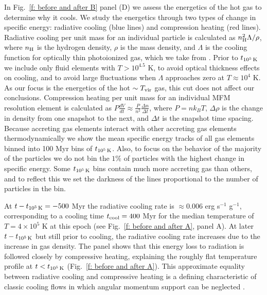 \documentclass[fleqn,usenatbib]{mnras}
\newcommand{\tcools}{t_{10^5\,{\rm K}}}
\newcommand{\nH}{n_{\rm H}}
\newcommand{\Tvir}{T_{\rm vir}}
\begin{document}
In Fig.~\ref{f: before and after B} panel (D) we assess the energetics of the hot gas to determine why it cools.
We study the energetics through two types of change in specific energy: radiative cooling (blue lines) and compression heating (red lines).
Radiative cooling per unit mass for an individual particle is calculated as $\nH^2 \Lambda / \rho$, where $\nH$ is the hydrogen density, $\rho$ is the mass density, and $\Lambda$ is the cooling function for optically thin photoionized gas, which we take from \cite{Wiersma2009a}.
Prior to $\tcools$ we include only fluid elements with $T>10^{4.5}$ K, to avoid optical thickness effects on cooling, and to avoid large fluctuations when $\Lambda$ approaches zero at $T\approx10^4$ K.
As our focus is the energetics of the hot $\sim\Tvir$ gas, this cut does not affect our conclusions. 
Compression heating per unit mass for an individual MFM resolution element is calculated as $P \frac{dV}{dt} \approx \frac{ P }{ n^2 } \frac{ \Delta n }{ \Delta t }$, where $P = n k_B T$, $\Delta \rho$ is the change in density from one snapshot to the next, and $\Delta t$ is the snapshot time spacing.
Because accreting gas elements interact with other accreting gas elements thermodynamically we show the mean specific energy tracks of all gas elements binned into 100 Myr bins of $\tcools$. 
Also, to focus on the behavior of the majority of the particles we do not bin the $1\%$ of particles with the highest change in specific energy.
Some $\tcools$ bins contain much more accreting gas than others, and to reflect this we set the darkness of the lines proportional to the number of particles in the bin.

At $t-\tcools=-500$ Myr the radiative cooling rate is $\approx0.006$ erg s$^{-1}$ g$^{-1}$, corresponding to a cooling time $t_{\rm cool}=400$ Myr for the median temperature of $T=4\times 10^5$ K at this epoch (see Fig.~\ref{f: before and after A}, panel A). 
At later $t-\tcools$ but still prior to cooling, the radiative cooling rate increases due to the increase in gas density.
The panel shows that this energy loss to radiation is followed closely by compressive heating, explaining the roughly flat temperature profile at $t<\tcools$ (Fig.~\ref{f: before and after A}). 
This approximate equality between radiative cooling and compressive heating is a defining characteristic of classic cooling flows in which angular momentum support can be neglected \citep{Mathews1978, McNamara2007, Stern2019}. 
\end{document}
